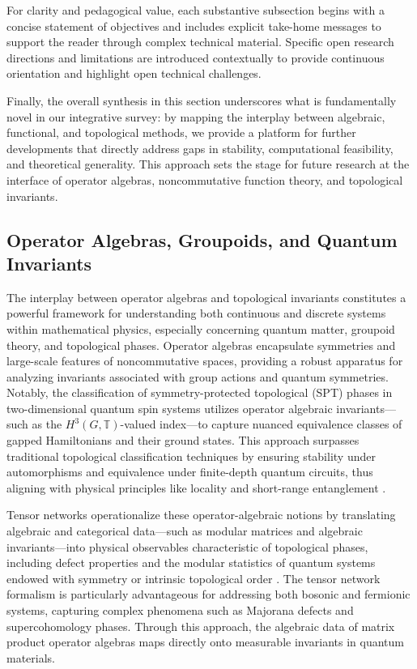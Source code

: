 \documentclass[sigconf]{acmart}
\begin{document}
For clarity and pedagogical value, each substantive subsection begins with a concise statement of objectives and includes explicit take-home messages to support the reader through complex technical material. Specific open research directions and limitations are introduced contextually to provide continuous orientation and highlight open technical challenges.

Finally, the overall synthesis in this section underscores what is fundamentally novel in our integrative survey: by mapping the interplay between algebraic, functional, and topological methods, we provide a platform for further developments that directly address gaps in stability, computational feasibility, and theoretical generality. This approach sets the stage for future research at the interface of operator algebras, noncommutative function theory, and topological invariants.

\subsection{Operator Algebras, Groupoids, and Quantum Invariants}

The interplay between operator algebras and topological invariants constitutes a powerful framework for understanding both continuous and discrete systems within mathematical physics, especially concerning quantum matter, groupoid theory, and topological phases. Operator algebras encapsulate symmetries and large-scale features of noncommutative spaces, providing a robust apparatus for analyzing invariants associated with group actions and quantum symmetries. Notably, the classification of symmetry-protected topological (SPT) phases in two-dimensional quantum spin systems utilizes operator algebraic invariants—such as the $H^3(G, \mathbb{T})$-valued index—to capture nuanced equivalence classes of gapped Hamiltonians and their ground states. This approach surpasses traditional topological classification techniques by ensuring stability under automorphisms and equivalence under finite-depth quantum circuits, thus aligning with physical principles like locality and short-range entanglement \cite{ref18}.

Tensor networks operationalize these operator-algebraic notions by translating algebraic and categorical data—such as modular matrices and algebraic invariants—into physical observables characteristic of topological phases, including defect properties and the modular statistics of quantum systems endowed with symmetry or intrinsic topological order \cite{ref21}. The tensor network formalism is particularly advantageous for addressing both bosonic and fermionic systems, capturing complex phenomena such as Majorana defects and supercohomology phases. Through this approach, the algebraic data of matrix product operator algebras maps directly onto measurable invariants in quantum materials.
\end{document}
